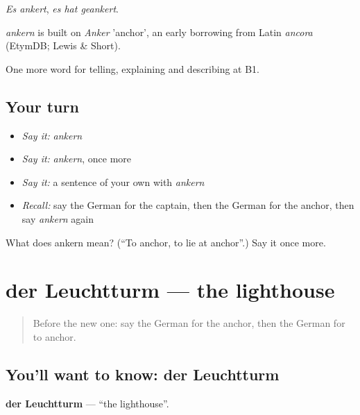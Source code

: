 \emph{Es ankert}, \emph{es hat geankert}.

\begin{cousinweb}
\emph{ankern} is built on \emph{Anker} 'anchor', an early borrowing from Latin \emph{ancora} (EtymDB; Lewis \& Short).
\end{cousinweb}

\begin{grammarlens}[title={What you've built}]
One more word for telling, explaining and describing at B1.
\end{grammarlens}

\subsection*{Your turn}
\begin{itemize}
\raggedright
  \item \emph{Say it:} \emph{ankern}
  \item \emph{Say it:} \emph{ankern}, once more
  \item \emph{Say it:} a sentence of your own with \emph{ankern}
  \item \emph{Recall:} say the German for the captain, then the German for the anchor, then say \emph{ankern} again
\end{itemize}

\begin{tcolorbox}[breakable,colback=teal!4,colframe=teal!35!black,title={Before you move on}]
What does ankern mean? (\textquotedblleft{}To anchor, to lie at anchor\textquotedblright{}.) Say it once more.
\end{tcolorbox}
\section[der Leuchtturm]{der Leuchtturm — the lighthouse}

\label{lesson:GE-C423-leuchtturm}



\begin{quote}
Before the new one: say the German for the anchor, then the German for to anchor.
\end{quote}

\subsection*{You'll want to know: der Leuchtturm}
\textbf{der Leuchtturm} — \textquotedblleft{}the lighthouse\textquotedblright{}.

